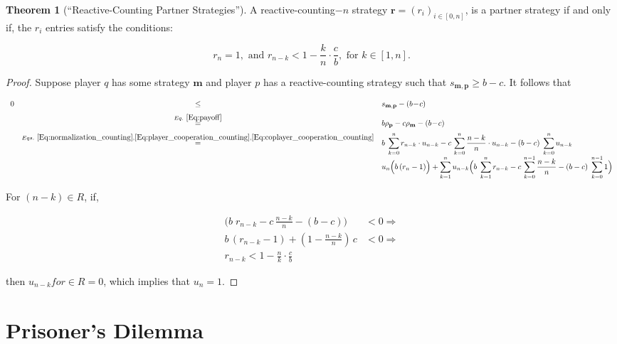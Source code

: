 \documentclass{article}
\theoremstyle{definition}
\newtheorem{theorem}{Theorem}[section]
\begin{document}
\begin{theorem}[``Reactive-Counting Partner Strategies'']
A reactive-counting$-n$ strategy $\mathbf{r}=(r_i)_{i \in [0, n]}$,
is a partner strategy if and only if, the $r_i$ entries satisfy the conditions:

\begin{equation}
  r_{n} = 1, \text{ and  } r_{n - k} < 1 - \frac{k}{n} \cdot \frac{c}{b}, \text{ for } k \in [1, n].
\end{equation}

\begin{proof}
Suppose player $q$ has some strategy $\mathbf{m}$ and player $p$ has a reactive-counting
strategy such that $s_{\mathbf{m}, \mathbf{p}} \ge b\!-\!c$. It follows that

\begin{equation}
\begin{array}{rcl}
0 	&\le	&s_{\mathbf{m}, \mathbf{p}}-(b\!-\!c)\\[0.2cm]
  &\stackrel{Eq.~\eqref{Eq:payoff}}{=}	&b\rho_\mathbf{p} - c\rho_\mathbf{m}-(b\!-\!c)\\[0.2cm]
  &\stackrel{Eqs.~\eqref{Eq:normalization_counting}, \eqref{Eq:player_cooperation_counting}, \eqref{Eq:coplayer_cooperation_counting}}{=}	& 
  \displaystyle b\; \sum_{k=0}^{n} r_{n - k} \cdot u_{n - k} - c\, \sum_{k=0}^{n} \frac{n - k}{n} \cdot u_{n - k} - (b - c)\; \sum_{k=0}^{n} u_{n - k}\\[0.2cm]
  & & \displaystyle  u_{n} \Big(b\, (r_n - 1) \Big) +  \sum_{k=1}^{n} u_{n - k} \Big(b\; \sum_{k=1}^{n} r_{n - k} - c\, \sum_{k=0}^{n - 1} \frac{n - k}{n} - (b - c)\; \sum_{k=0}^{n - 1} 1\Big)
\end{array}
\end{equation}

For $(n-k) \in R$, if,

\begin{align}
  \Big(b\; r_{n - k} - c\, \frac{n - k}{n} - (b - c)\Big) & < 0 \Rightarrow \\ 
  b \, (r_{n - k} - 1) + (1 - \frac{n - k}{n})\, c & < 0 \Rightarrow \\ 
  r_{n - k} < 1 - \frac{n}{k} \cdot \frac{c}{b}
\end{align}

then $u_{n - k} for \in R \!=\! 0$, which implies that $u_{n} = 1$.
\end{proof}

\end{theorem}

\section{Prisoner's Dilemma}
\end{document}
